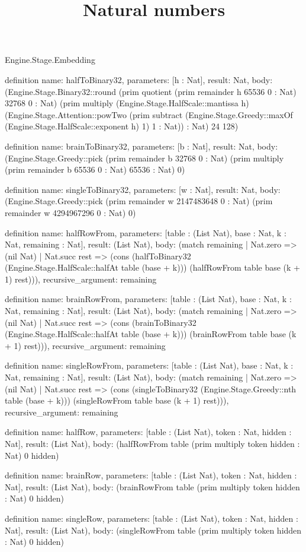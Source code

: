 \begin{lexlean}{Engine.Stage.Embedding}
\title{Natural numbers}
\begin{semanticmodule}
definition{
  name: halfToBinary32,
  parameters: [h : Nat],
  result: Nat,
  body: (Engine.Stage.Binary32::round (prim quotient (prim remainder h 65536 0 : Nat) 32768 0 : Nat) (prim multiply (Engine.Stage.HalfScale::mantissa h) (Engine.Stage.Attention::powTwo (prim subtract (Engine.Stage.Greedy::maxOf (Engine.Stage.HalfScale::exponent h) 1) 1 : Nat)) : Nat) 24 128)
}

definition{
  name: brainToBinary32,
  parameters: [b : Nat],
  result: Nat,
  body: (Engine.Stage.Greedy::pick (prim remainder b 32768 0 : Nat) (prim multiply (prim remainder b 65536 0 : Nat) 65536 : Nat) 0)
}

definition{
  name: singleToBinary32,
  parameters: [w : Nat],
  result: Nat,
  body: (Engine.Stage.Greedy::pick (prim remainder w 2147483648 0 : Nat) (prim remainder w 4294967296 0 : Nat) 0)
}

definition{
  name: halfRowFrom,
  parameters: [table : (List Nat), base : Nat, k : Nat, remaining : Nat],
  result: (List Nat),
  body: (match remaining
    | Nat.zero => (nil Nat)
    | Nat.succ rest => (cons (halfToBinary32 (Engine.Stage.HalfScale::halfAt table (base + k))) (halfRowFrom table base (k + 1) rest))),
  recursive_argument: remaining
}

definition{
  name: brainRowFrom,
  parameters: [table : (List Nat), base : Nat, k : Nat, remaining : Nat],
  result: (List Nat),
  body: (match remaining
    | Nat.zero => (nil Nat)
    | Nat.succ rest => (cons (brainToBinary32 (Engine.Stage.HalfScale::halfAt table (base + k))) (brainRowFrom table base (k + 1) rest))),
  recursive_argument: remaining
}

definition{
  name: singleRowFrom,
  parameters: [table : (List Nat), base : Nat, k : Nat, remaining : Nat],
  result: (List Nat),
  body: (match remaining
    | Nat.zero => (nil Nat)
    | Nat.succ rest => (cons (singleToBinary32 (Engine.Stage.Greedy::nth table (base + k))) (singleRowFrom table base (k + 1) rest))),
  recursive_argument: remaining
}

definition{
  name: halfRow,
  parameters: [table : (List Nat), token : Nat, hidden : Nat],
  result: (List Nat),
  body: (halfRowFrom table (prim multiply token hidden : Nat) 0 hidden)
}

definition{
  name: brainRow,
  parameters: [table : (List Nat), token : Nat, hidden : Nat],
  result: (List Nat),
  body: (brainRowFrom table (prim multiply token hidden : Nat) 0 hidden)
}

definition{
  name: singleRow,
  parameters: [table : (List Nat), token : Nat, hidden : Nat],
  result: (List Nat),
  body: (singleRowFrom table (prim multiply token hidden : Nat) 0 hidden)
}
\end{semanticmodule}
\end{lexlean}
